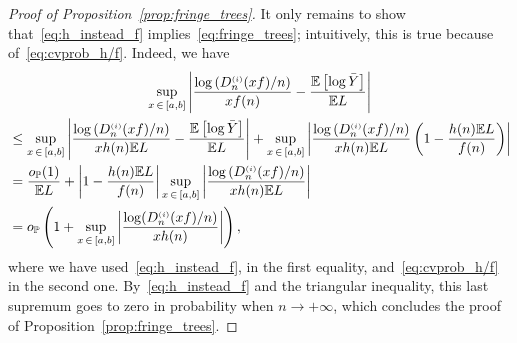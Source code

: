 \documentclass[AHL,Unicode,longabstracts,published]{cedram}
\newcommand{\sss}{\ensuremath{\scriptscriptstyle}}
\newcommand{\op}{{o_{\bbP}}}
\newcommand{\bbP}{\mathbb{P}}
\newcommand{\bbE}{\mathbb{E}}
\begin{document}
\begin{proof}[Proof of Proposition~\ref{prop:fringe_trees}]
It only remains to show that~\eqref{eq:h_instead_f} implies~\eqref{eq:fringe_trees}; intuitively, this is true because of~\eqref{eq:cvprob_h/f}. Indeed, we have
\begin{multline*}
\sup_{x\,\in\,[a,b]} \left|\frac{\log \left(D_n^{\sss (i)}(xf)/n\right)}{xf(n)}- \frac{\bbE\left[\log \bar Y\right]}{\bbE L}\right|\\
\begin{aligned}
&\leq \sup_{x\,\in\,[a,b]} \left|\frac{\log\left(D_n^{\sss (i)}(xf)/n\right)}{xh(n)\bbE L}- \frac{\bbE\left[\log \bar Y\right]}{\bbE L}\right| + \sup_{x\,\in\,[a,b]} \left|\frac{\log \left(D_n^{\sss (i)}(xf)/n\right)}{xh(n)\bbE L}\left(1-\frac{h(n)\bbE L}{f(n)}\right)\right|\\
&= \frac{\op(1)}{\bbE L} + \left|1-\frac{h(n)\bbE L}{f(n)}\right| \sup_{x\,\in\,[a,b]} \left|\frac{\log \left(D_n^{\sss (i)}(xf)/n\right)}{xh(n)\bbE L}\right|
\\
&= \op\left(1+\sup_{x\,\in\,[a,b]} \left|\frac{\log (D_n^{\sss (i)}(xf)/n)}{xh(n)}\right|\right),
\end{aligned}
\end{multline*}
where we have used~\eqref{eq:h_instead_f}, in the first equality, and~\eqref{eq:cvprob_h/f} in the second one. By~\eqref{eq:h_instead_f} and the triangular inequality, this last supremum goes to zero in probability when $n\to+\infty$, which concludes the proof of Proposition~\ref{prop:fringe_trees}.
\end{proof}
\end{document}
